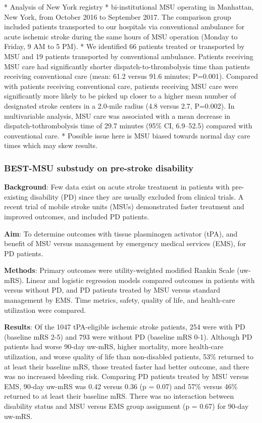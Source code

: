 \begin{markdown}
* Analysis of New York registry
* bi-institutional MSU operating in Manhattan, New York, from October 2016 to September 2017. The comparison group included patients transported to our hospitals via conventional ambulance for acute ischemic stroke during the same hours of MSU operation (Monday to Friday, 9 AM to 5 PM).
* We identified 66 patients treated or transported by MSU and 19 patients transported by conventional ambulance. Patients receiving MSU care had significantly shorter dispatch-to-thrombolysis time than patients receiving conventional care (mean: 61.2 versus 91.6 minutes; P=0.001). Compared with patients receiving conventional care, patients receiving MSU care were significantly more likely to be picked up closer to a higher mean number of designated stroke centers in a 2.0-mile radius (4.8 versus 2.7, P=0.002). In multivariable analysis, MSU care was associated with a mean decrease in dispatch-tothrombolysis time of 29.7 minutes (95\% CI, 6.9–52.5) compared with conventional care.
* Possible issue here is MSU biased towards normal day care times which may skew results.
\end{markdown}

\subsubsection{BEST-MSU substudy on pre-stroke disability \cite{pirlog_outcomes_2023}}

\textbf{Background}: Few data exist on acute stroke treatment in patients with pre-existing disability (PD) since they are usually excluded from clinical trials. A recent trial of mobile stroke units (MSUs) demonstrated faster treatment and improved outcomes, and included PD patients.

\textbf{Aim}: To determine outcomes with tissue plasminogen activator (tPA), and benefit of MSU versus management by emergency medical services (EMS), for PD patients.

\textbf{Methods}: Primary outcomes were utility-weighted modified Rankin Scale (uw-mRS). Linear and logistic regression models compared outcomes in patients with versus without PD, and PD patients treated by MSU versus standard management by EMS. Time metrics, safety, quality of life, and health-care utilization were compared.

\textbf{Results}: Of the 1047 tPA-eligible ischemic stroke patients, 254 were with PD (baseline mRS 2-5) and 793 were without PD (baseline mRS 0-1). Although PD patients had worse 90-day uw-mRS, higher mortality, more health-care utilization, and worse quality of life than non-disabled patients, 53\% returned to at least their baseline mRS, those treated faster had better outcome, and there was no increased bleeding risk. Comparing PD patients treated by MSU versus EMS, 90-day uw-mRS was 0.42 versus 0.36 (p = 0.07) and 57\% versus 46\% returned to at least their baseline mRS. There was no interaction between disability status and MSU versus EMS group assignment (p = 0.67) for 90-day uw-mRS.


